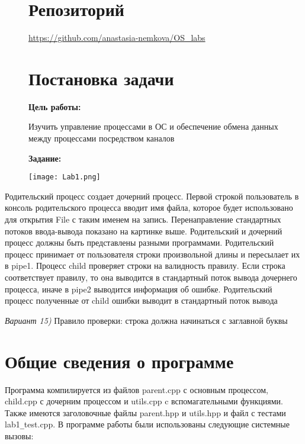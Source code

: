 \documentclass[a4paper, 14pt]{article}
\begin{document}
\begin{figure}
\section*{Репозиторий}   
\vspace{2ex}
\url{https://github.com/anastasia-nemkova/OS_labs}

\section*{Постановка задачи}   
\textbf{Цель работы:}
\vspace{2ex}

Изучить управление процессами в ОС и обеспечение обмена данных между процессами посредством каналов

\vspace{4ex}
\textbf{Задание:}
\vspace{2ex}

    \centering
    \texttt{[image: Lab1.png]}
    \label{fig:enter-label}
\end{figure}

Родительский процесс создает дочерний процесс. Первой строкой пользователь в консоль 
родительского процесса вводит имя файла, которое будет использовано для открытия File с таким именем на запись. Перенаправление стандартных потоков ввода-вывода показано на картинке выше. Родительский и дочерний процесс должны быть представлены разными программами. Родительский процесс принимает от пользователя строки произвольной длины и пересылает их в pipe1. Процесс child проверяет строки на валидность правилу. Если строка соответствует правилу, то она выводится в стандартный поток вывода дочернего процесса, иначе в pipe2 выводится информация об ошибке. Родительский процесс полученные от child ошибки выводит в стандартный поток вывода\newline

\textit{Вариант 15)} Правило проверки: строка должна начинаться с заглавной буквы

\newpage
\section*{Общие сведения о программе}

Программа компилируется из файлов parent.cpp с основным процессом, child.cpp с дочерним процессом и utils.cpp c вспомагательными функциями. Также имеются заголовочные файлы parent.hpp и utils.hpp и файл с тестами lab1\texttt{\_}test.cpp. В программе работы были использованы следующие системные вызовы:
\end{document}
